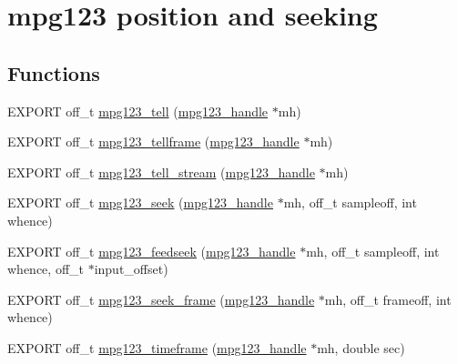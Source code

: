\hypertarget{group__mpg123__seek}{}\section{mpg123 position and seeking}
\label{group__mpg123__seek}
\subsection*{Functions}
\begin{DoxyCompactItemize}
\item 
E\+X\+P\+O\+RT off\+\_\+t \hyperlink{group__mpg123__seek_gaa52d46fb00dcd357abe8d0e642404151}{mpg123\+\_\+tell} (\hyperlink{group__mpg123__init_ga6728e2839a395f3a07d4514da659faca}{mpg123\+\_\+handle} $\ast$mh)
\item 
E\+X\+P\+O\+RT off\+\_\+t \hyperlink{group__mpg123__seek_gac9e7addd98557c3bb784a7b93b3eeb17}{mpg123\+\_\+tellframe} (\hyperlink{group__mpg123__init_ga6728e2839a395f3a07d4514da659faca}{mpg123\+\_\+handle} $\ast$mh)
\item 
E\+X\+P\+O\+RT off\+\_\+t \hyperlink{group__mpg123__seek_ga4c378fd8dc49dd4cb0eccd6de96c3f9d}{mpg123\+\_\+tell\+\_\+stream} (\hyperlink{group__mpg123__init_ga6728e2839a395f3a07d4514da659faca}{mpg123\+\_\+handle} $\ast$mh)
\item 
E\+X\+P\+O\+RT off\+\_\+t \hyperlink{group__mpg123__seek_ga9a20e3728c86d5a4bfa80facb9b36047}{mpg123\+\_\+seek} (\hyperlink{group__mpg123__init_ga6728e2839a395f3a07d4514da659faca}{mpg123\+\_\+handle} $\ast$mh, off\+\_\+t sampleoff, int whence)
\item 
E\+X\+P\+O\+RT off\+\_\+t \hyperlink{group__mpg123__seek_ga558dd104b09d39624ea73f9cb1d47cbc}{mpg123\+\_\+feedseek} (\hyperlink{group__mpg123__init_ga6728e2839a395f3a07d4514da659faca}{mpg123\+\_\+handle} $\ast$mh, off\+\_\+t sampleoff, int whence, off\+\_\+t $\ast$input\+\_\+offset)
\item 
E\+X\+P\+O\+RT off\+\_\+t \hyperlink{group__mpg123__seek_ga5e0882914fcb29fbc6018711b18b012a}{mpg123\+\_\+seek\+\_\+frame} (\hyperlink{group__mpg123__init_ga6728e2839a395f3a07d4514da659faca}{mpg123\+\_\+handle} $\ast$mh, off\+\_\+t frameoff, int whence)
\item 
E\+X\+P\+O\+RT off\+\_\+t \hyperlink{group__mpg123__seek_gaee6dc54beea9eae0e196a357ed55cd5f}{mpg123\+\_\+timeframe} (\hyperlink{group__mpg123__init_ga6728e2839a395f3a07d4514da659faca}{mpg123\+\_\+handle} $\ast$mh, double sec)
\item 

\end{DoxyCompactItemize}
